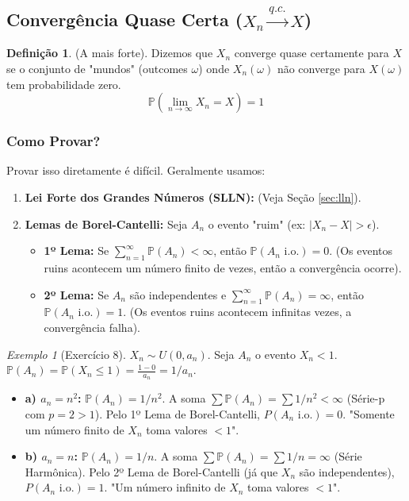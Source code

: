 \documentclass[a4paper, 10pt]{article} %
\theoremstyle{definition}
\newtheorem{definition}{Definição}[section] %
\theoremstyle{plain}
\theoremstyle{remark}
\newtheorem{example}{Exemplo}[section]
\newcommand{\Prob}{\mathbb{P}}
\newcommand{\qcto}{\xrightarrow{q.c.}}  %
\begin{document}
\subsection{Convergência Quase Certa (\texorpdfstring{$X_n \qcto X$}{X\_n -> q.c. X})}
\label{sec:conv_qc}

\begin{definition}
(A mais forte). Dizemos que $X_n$ converge quase certamente para $X$ se o conjunto de "mundos" (outcomes $\omega$) onde $X_n(\omega)$ não converge para $X(\omega)$ tem probabilidade zero.
$$ \Prob\left( \lim_{n \to \infty} X_n = X \right) = 1 $$
\end{definition}

\subsubsection{Como Provar?}
Provar isso diretamente é difícil. Geralmente usamos:
\begin{enumerate}
    \item \textbf{Lei Forte dos Grandes Números (SLLN):} (Veja Seção \ref{sec:lln}).
    \item \textbf{Lemas de Borel-Cantelli:}
        Seja $A_n$ o evento "ruim" (ex: $|X_n - X| > \epsilon$).
        \begin{itemize}
            \item \textbf{1º Lema:} Se $\sum_{n=1}^\infty \Prob(A_n) < \infty$, então $\Prob(A_n \text{ i.o.}) = 0$. (Os eventos ruins acontecem um número finito de vezes, então a convergência ocorre).
            \item \textbf{2º Lema:} Se $A_n$ são independentes e $\sum_{n=1}^\infty \Prob(A_n) = \infty$, então $\Prob(A_n \text{ i.o.}) = 1$. (Os eventos ruins acontecem infinitas vezes, a convergência falha).
        \end{itemize}
\end{enumerate}

\begin{example}[Exercício 8]
    $X_n \sim U(0, a_n)$. Seja $A_n$ o evento $X_n < 1$. $\Prob(A_n) = \Prob(X_n \le 1) = \frac{1 - 0}{a_n} = 1/a_n$.
    \begin{itemize}
        \item \textbf{a) $a_n = n^2$:} $\Prob(A_n) = 1/n^2$. A soma $\sum \Prob(A_n) = \sum 1/n^2 < \infty$ (Série-p com $p=2 > 1$). Pelo 1º Lema de Borel-Cantelli, $P(A_n \text{ i.o.}) = 0$. "Somente um número finito de $X_n$ toma valores $< 1$".
        \item \textbf{b) $a_n = n$:} $\Prob(A_n) = 1/n$. A soma $\sum \Prob(A_n) = \sum 1/n = \infty$ (Série Harmônica). Pelo 2º Lema de Borel-Cantelli (já que $X_n$ são independentes), $P(A_n \text{ i.o.}) = 1$. "Um número infinito de $X_n$ toma valores $< 1$".
    \end{itemize}
\end{example}
\end{document}
